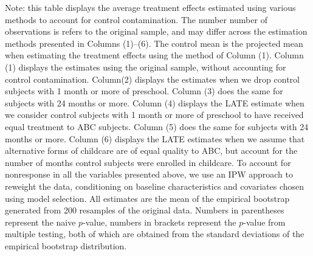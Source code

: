 \begin{table}[H]
\begin{threeparttable}
\begin{tabular}{cccccccccc}
  \hline\hline
  \end{tabular}
    \begin{tablenotes}
    \scriptsize
    \item 
Note: this table displays the average treatment effects estimated using various methods to
account for control contamination. The number number of observations is refers to the 
original sample, and may differ across the estimation methods presented in Columns (1)--(6). 
The control mean is the projected mean when estimating the treatment 
effects using the method of Column (1). Column (1) displays the estimates using the original
sample, without accounting for control contamination. 
Column(2) displays the estimates when we drop control subjects with 1 month or more of preschool.
Column (3) does the same for subjects with 24 months or more. Column (4) displays the LATE
estimate when we consider control subjects with 1 month or more of preschool to have received
equal treatment to ABC subjects. Column (5) does the same for subjects with 24 months or more.
Column (6) displays the LATE estimates when we assume that alternative forms of childcare
are of equal quality to ABC, but account for the number of months control subjects were
enrolled in childcare. To account for nonresponse in all the variables presented above, we use an IPW approach to reweight the data,
conditioning on baseline characteristics and covariates chosen using model selection. 
All estimates are the mean of the empirical bootstrap generated 
from 200 resamples of the original data. Numbers in parentheses represent the naive $p$-value,
numbers in brackets represent the $p$-value from multiple testing, both of which are obtained from 
the standard deviations of the empirical bootstrap distribution.

    \end{tablenotes}
  \end{threeparttable}

\end{table}